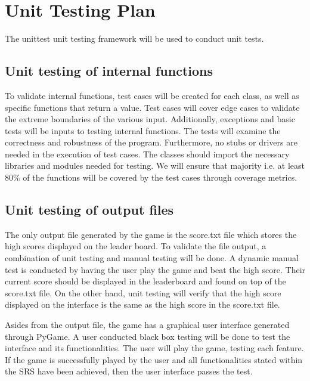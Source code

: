 \documentclass[12pt, titlepage]{article}
\begin{document}
\section{Unit Testing Plan}


The unittest unit testing framework will be used to conduct unit tests.
		
\subsection{Unit testing of internal functions}

	
To validate internal functions, test cases will be created for each class, as well as specific functions that return a value. Test cases will cover edge cases to validate the extreme boundaries of the various input. Additionally, exceptions and basic tests will be inputs to testing internal functions. The tests will examine the correctness and robustness of the program.  Furthermore, no stubs or drivers are needed in the execution of test cases. The classes should import the necessary libraries and modules needed for testing. We will ensure that majority {i.e. at least 80\%} of the functions will be covered by the test cases through coverage metrics. 


\subsection{Unit testing of output files}		

The only output file generated by the game is the score.txt file which stores the high scores displayed on the leader board. To validate the file output, a combination of unit testing and manual testing will be done. A dynamic manual test is conducted by having the user play the game and beat the high score. Their current score should be displayed in the leaderboard and found on top of the score.txt file. On the other hand, unit testing will verify that the high score displayed on the interface is the same as the high score in the score.txt file. 

Asides from the output file, the game has a graphical user interface generated through PyGame. A user conducted black box testing will be done to test the interface and its functionalities. The user will play the game, testing each feature. If the game is successfully played by the user and all functionalities stated within the SRS have been achieved, then the user interface passes the test.



\end{document}
